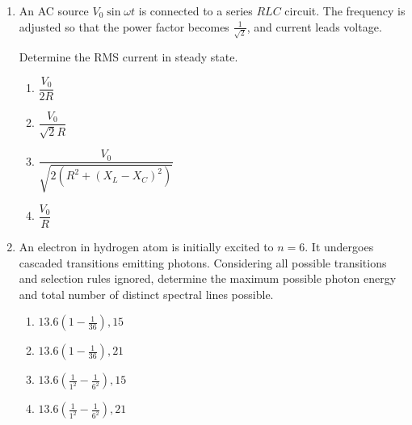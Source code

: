 \documentclass[12pt]{article}
\begin{document}
\begin{enumerate}
\begin{center}
\end{center}

\begin{enumerate}
\item $\dfrac{\mu_0 I}{2R} + \dfrac{\mu_0 I}{2\pi a}$
\item $\left| \dfrac{\mu_0 I}{2R} - \dfrac{\mu_0 I}{2\pi a} \right|$
\item $\dfrac{\mu_0 I}{2R}$
\item $\dfrac{\mu_0 I}{2\pi a}$
\end{enumerate}
\item
An AC source $V_0 \sin \omega t$ is connected to a series $RLC$ circuit.
The frequency is adjusted so that the power factor becomes $\frac{1}{\sqrt{2}}$, and current leads voltage.

Determine the RMS current in steady state.

\begin{enumerate}
\item $\dfrac{V_0}{2R}$
\item $\dfrac{V_0}{\sqrt{2}R}$
\item $\dfrac{V_0}{\sqrt{2(R^2+(X_L-X_C)^2)}}$
\item $\dfrac{V_0}{R}$
\end{enumerate}

\item
An electron in hydrogen atom is initially excited to $n=6$. It undergoes cascaded transitions emitting photons. Considering all possible transitions and selection rules ignored, determine the maximum possible photon energy and total number of distinct spectral lines possible.

\begin{enumerate}
\item $13.6\left(1-\frac{1}{36}\right), 15$
\item $13.6\left(1-\frac{1}{36}\right), 21$
\item $13.6\left(\frac{1}{1^2}-\frac{1}{6^2}\right), 15$
\item $13.6\left(\frac{1}{1^2}-\frac{1}{6^2}\right), 21$
\end{enumerate}


\end{enumerate}
\end{document}
